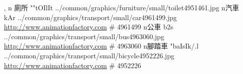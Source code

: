 \begin{tGe}{14}{, }
     {n} {廁所}  {}{""tOIlIt}    {../common/graphics/furniture/small/toilet4951461.jpg}      {}
         {n}{汽車}   {}{kAr}                {../common/graphics/transport/small/car4961499.jpg      }{\url{http://www.animationfactory.com} \;\# 4961499}
         {n}{公車}   {}{b2s}                {../common/graphics/transport/small/bus4963060.jpg      }{\url{http://www.animationfactory.com} \;\# 4963060}
     {n}{腳踏車} {}{"baIsIk{/.l}}       {../common/graphics/transport/small/bicycle4952226.jpg  }{\url{http://www.animationfactory.com} \;\# 4952226}

\end{tGe}
